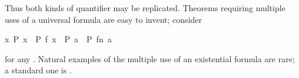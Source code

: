 \begin{isabellebody}
\begin{isamarkuptext}
\[  \]
  Thus both kinds of quantifier may be replicated.  Theorems requiring
  multiple uses of a universal formula are easy to invent; consider
  \begin{isabelle}%
{}{}{}x{}\ P\ x\ {}\ P\ {}f\ x{}{}\ {}\ P\ a\ {}\ P\ {}f\isactrlsup n\ a{}{}%
\end{isabelle} for any
  .  Natural examples of the multiple use of an
  existential formula are rare; a standard one is .


\end{isamarkuptext}
\end{isabellebody}
